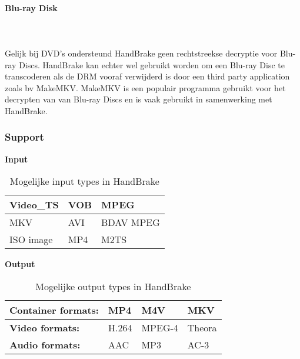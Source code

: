\paragraph{Blu-ray Disk}  
\ \\
\ \\
Gelijk bij DVD's ondersteund HandBrake geen rechtstreekse decryptie voor Blu-ray Discs. HandBrake kan echter wel gebruikt worden om een Blu-ray Disc te transcoderen als de DRM vooraf verwijderd is door een third party application zoals bv MakeMKV. MakeMKV is een populair programma gebruikt voor het decrypten van van Blu-ray Discs en is vaak gebruikt in samenwerking met HandBrake.

\subsubsection{Support}

\begin{table}[!h]
\textbf{Input}\\
\centering
\begin{tabular}{ | l | l | l | }
\hline
Video\_TS & VOB & MPEG \\ \hline
MKV & AVI & BDAV MPEG\-2 \\ \hline
ISO image & MP4 & M2TS \\
\hline
\end{tabular}
\caption{Mogelijke input types in HandBrake}
\label{tab:input}
\end{table}

\begin{table}[!h]
\textbf{Output}\\
\centering
\begin{tabular}{ | l | l | l | l | }
\hline
\textbf{Container formats:} & MP4 & M4V & MKV \\ \hline
\textbf{Video formats:} & H.264 & MPEG-4 & Theora \\ \hline
\textbf{Audio formats:} & AAC & MP3 & AC-3 \\
\hline
\end{tabular}
\caption{Mogelijke output types in HandBrake}
\label{tab:output}
\end{table}
\ \\